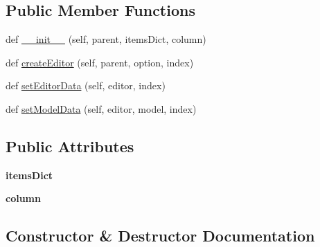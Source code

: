 \subsection*{Public Member Functions}
\begin{DoxyCompactItemize}
\item 
def \mbox{\hyperlink{class_dsg_tools_1_1_complex_tools_1_1manage_complex_1_1_combo_box_delegate_aa241872631d2160ec24d8ec665c9acb2}{\+\_\+\+\_\+init\+\_\+\+\_\+}} (self, parent, items\+Dict, column)
\item 
def \mbox{\hyperlink{class_dsg_tools_1_1_complex_tools_1_1manage_complex_1_1_combo_box_delegate_ab1da59b8c14cdac1c3d9cd6dbcf15e7f}{create\+Editor}} (self, parent, option, index)
\item 
def \mbox{\hyperlink{class_dsg_tools_1_1_complex_tools_1_1manage_complex_1_1_combo_box_delegate_a6b843555d229fb69f2ec7ec0c2585225}{set\+Editor\+Data}} (self, editor, index)
\item 
def \mbox{\hyperlink{class_dsg_tools_1_1_complex_tools_1_1manage_complex_1_1_combo_box_delegate_a68c7e32449f402268047cf6cffb41c25}{set\+Model\+Data}} (self, editor, model, index)
\end{DoxyCompactItemize}
\subsection*{Public Attributes}
\begin{DoxyCompactItemize}
\item 
\mbox{\label{class_dsg_tools_1_1_complex_tools_1_1manage_complex_1_1_combo_box_delegate_ab9467c715828b0d3645c5653bcb1acc2}} 
{\bfseries items\+Dict}
\item 
\mbox{\label{class_dsg_tools_1_1_complex_tools_1_1manage_complex_1_1_combo_box_delegate_a1e7364d9426fc8088260a06cb6ecbcbf}} 
{\bfseries column}
\end{DoxyCompactItemize}


\subsection{Constructor \& Destructor Documentation}
\mbox{\label{class_dsg_tools_1_1_complex_tools_1_1manage_complex_1_1_combo_box_delegate_aa241872631d2160ec24d8ec665c9acb2}} 
